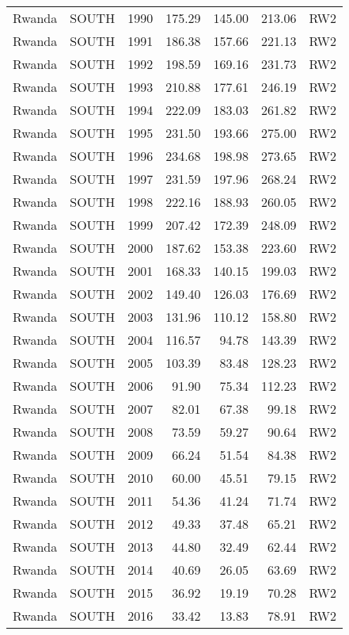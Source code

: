 \begin{longtable}{lllrrrl}
  Rwanda & SOUTH & 1990 & 175.29 & 145.00 & 213.06 & RW2 \\ 
  Rwanda & SOUTH & 1991 & 186.38 & 157.66 & 221.13 & RW2 \\ 
  Rwanda & SOUTH & 1992 & 198.59 & 169.16 & 231.73 & RW2 \\ 
  Rwanda & SOUTH & 1993 & 210.88 & 177.61 & 246.19 & RW2 \\ 
  Rwanda & SOUTH & 1994 & 222.09 & 183.03 & 261.82 & RW2 \\ 
  Rwanda & SOUTH & 1995 & 231.50 & 193.66 & 275.00 & RW2 \\ 
  Rwanda & SOUTH & 1996 & 234.68 & 198.98 & 273.65 & RW2 \\ 
  Rwanda & SOUTH & 1997 & 231.59 & 197.96 & 268.24 & RW2 \\ 
  Rwanda & SOUTH & 1998 & 222.16 & 188.93 & 260.05 & RW2 \\ 
  Rwanda & SOUTH & 1999 & 207.42 & 172.39 & 248.09 & RW2 \\ 
  Rwanda & SOUTH & 2000 & 187.62 & 153.38 & 223.60 & RW2 \\ 
  Rwanda & SOUTH & 2001 & 168.33 & 140.15 & 199.03 & RW2 \\ 
  Rwanda & SOUTH & 2002 & 149.40 & 126.03 & 176.69 & RW2 \\ 
  Rwanda & SOUTH & 2003 & 131.96 & 110.12 & 158.80 & RW2 \\ 
  Rwanda & SOUTH & 2004 & 116.57 & 94.78 & 143.39 & RW2 \\ 
  Rwanda & SOUTH & 2005 & 103.39 & 83.48 & 128.23 & RW2 \\ 
  Rwanda & SOUTH & 2006 & 91.90 & 75.34 & 112.23 & RW2 \\ 
  Rwanda & SOUTH & 2007 & 82.01 & 67.38 & 99.18 & RW2 \\ 
  Rwanda & SOUTH & 2008 & 73.59 & 59.27 & 90.64 & RW2 \\ 
  Rwanda & SOUTH & 2009 & 66.24 & 51.54 & 84.38 & RW2 \\ 
  Rwanda & SOUTH & 2010 & 60.00 & 45.51 & 79.15 & RW2 \\ 
  Rwanda & SOUTH & 2011 & 54.36 & 41.24 & 71.74 & RW2 \\ 
  Rwanda & SOUTH & 2012 & 49.33 & 37.48 & 65.21 & RW2 \\ 
  Rwanda & SOUTH & 2013 & 44.80 & 32.49 & 62.44 & RW2 \\ 
  Rwanda & SOUTH & 2014 & 40.69 & 26.05 & 63.69 & RW2 \\ 
  Rwanda & SOUTH & 2015 & 36.92 & 19.19 & 70.28 & RW2 \\ 
  Rwanda & SOUTH & 2016 & 33.42 & 13.83 & 78.91 & RW2 \\ 

\end{longtable}
